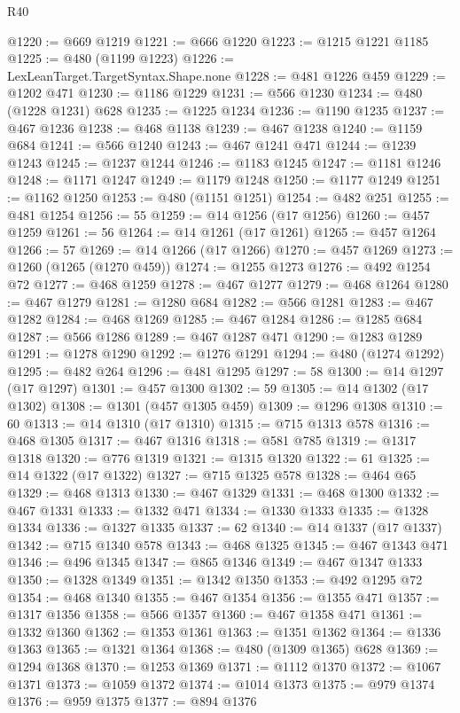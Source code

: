 \begin{lexlean}{R40}
\begin{coremodule}
@1220 := @669 @1219
@1221 := @666 @1220
@1223 := @1215 @1221 @1185
@1225 := @480 (@1199 @1223)
@1226 := LexLeanTarget.TargetSyntax.Shape.none
@1228 := @481 @1226 @459
@1229 := @1202 @471
@1230 := @1186 @1229
@1231 := @566 @1230
@1234 := @480 (@1228 @1231) @628
@1235 := @1225 @1234
@1236 := @1190 @1235
@1237 := @467 @1236
@1238 := @468 @1138
@1239 := @467 @1238
@1240 := @1159 @684
@1241 := @566 @1240
@1243 := @467 @1241 @471
@1244 := @1239 @1243
@1245 := @1237 @1244
@1246 := @1183 @1245
@1247 := @1181 @1246
@1248 := @1171 @1247
@1249 := @1179 @1248
@1250 := @1177 @1249
@1251 := @1162 @1250
@1253 := @480 (@1151 @1251)
@1254 := @482 @251
@1255 := @481 @1254
@1256 := 55
@1259 := @14 @1256 (@17 @1256)
@1260 := @457 @1259
@1261 := 56
@1264 := @14 @1261 (@17 @1261)
@1265 := @457 @1264
@1266 := 57
@1269 := @14 @1266 (@17 @1266)
@1270 := @457 @1269
@1273 := @1260 (@1265 (@1270 @459))
@1274 := @1255 @1273
@1276 := @492 @1254 @72
@1277 := @468 @1259
@1278 := @467 @1277
@1279 := @468 @1264
@1280 := @467 @1279
@1281 := @1280 @684
@1282 := @566 @1281
@1283 := @467 @1282
@1284 := @468 @1269
@1285 := @467 @1284
@1286 := @1285 @684
@1287 := @566 @1286
@1289 := @467 @1287 @471
@1290 := @1283 @1289
@1291 := @1278 @1290
@1292 := @1276 @1291
@1294 := @480 (@1274 @1292)
@1295 := @482 @264
@1296 := @481 @1295
@1297 := 58
@1300 := @14 @1297 (@17 @1297)
@1301 := @457 @1300
@1302 := 59
@1305 := @14 @1302 (@17 @1302)
@1308 := @1301 (@457 @1305 @459)
@1309 := @1296 @1308
@1310 := 60
@1313 := @14 @1310 (@17 @1310)
@1315 := @715 @1313 @578
@1316 := @468 @1305
@1317 := @467 @1316
@1318 := @581 @785
@1319 := @1317 @1318
@1320 := @776 @1319
@1321 := @1315 @1320
@1322 := 61
@1325 := @14 @1322 (@17 @1322)
@1327 := @715 @1325 @578
@1328 := @464 @65
@1329 := @468 @1313
@1330 := @467 @1329
@1331 := @468 @1300
@1332 := @467 @1331
@1333 := @1332 @471
@1334 := @1330 @1333
@1335 := @1328 @1334
@1336 := @1327 @1335
@1337 := 62
@1340 := @14 @1337 (@17 @1337)
@1342 := @715 @1340 @578
@1343 := @468 @1325
@1345 := @467 @1343 @471
@1346 := @496 @1345
@1347 := @865 @1346
@1349 := @467 @1347 @1333
@1350 := @1328 @1349
@1351 := @1342 @1350
@1353 := @492 @1295 @72
@1354 := @468 @1340
@1355 := @467 @1354
@1356 := @1355 @471
@1357 := @1317 @1356
@1358 := @566 @1357
@1360 := @467 @1358 @471
@1361 := @1332 @1360
@1362 := @1353 @1361
@1363 := @1351 @1362
@1364 := @1336 @1363
@1365 := @1321 @1364
@1368 := @480 (@1309 @1365) @628
@1369 := @1294 @1368
@1370 := @1253 @1369
@1371 := @1112 @1370
@1372 := @1067 @1371
@1373 := @1059 @1372
@1374 := @1014 @1373
@1375 := @979 @1374
@1376 := @959 @1375
@1377 := @894 @1376

\end{coremodule}
\end{lexlean}

